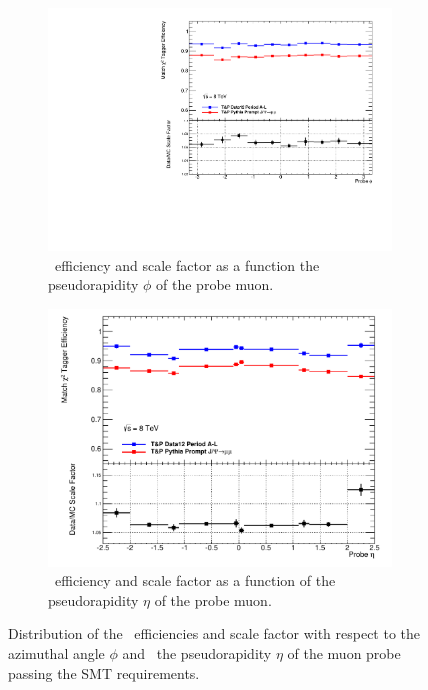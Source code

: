 \begin{figure}[htbp]
  \centering
  \begin{subfigure}[b]{0.75\textwidth}
    \includegraphics[width=\textwidth]{PartCalibration2012/Plots/SFPlots/phi_smt.pdf}
    \caption{\xsm\ efficiency and scale factor as a function the pseudorapidity $\phi$ of the probe muon.} \label{fig:CalibrationPhi}
  \end{subfigure}

  \begin{subfigure}[b]{0.75\textwidth}
    \includegraphics[width=\textwidth]{PartCalibration2012/Plots/SFPlots/eta_smt.pdf}
    \caption{\xsm\ efficiency and scale factor as a function of the pseudorapidity $\eta$ of the probe muon.} \label{fig:CalibrationEta}
  \end{subfigure}
  \caption{Distribution of the \xsm\ efficiencies and scale factor with respect to the~ azimuthal angle $\phi$ and~ the pseudorapidity $\eta$ of the muon probe passing the SMT requirements.} \label{fig:CalibrationAngularResults}
\end{figure}

